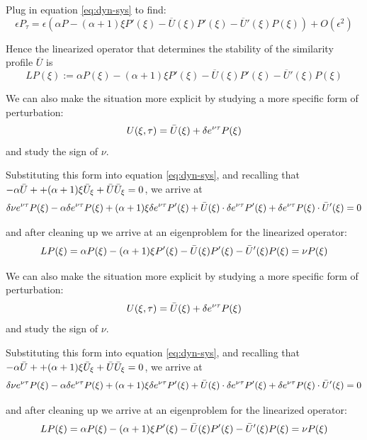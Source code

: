\documentclass[11pt,a4paper]{article}
\begin{document}
Plug in equation \ref{eq:dyn-sys} to find:
\begin{equation*}
    \epsilon P_\tau = \epsilon \left(\alpha P  -(\alpha + 1)\xi P'(\xi) - \overline{U}(\xi)P'(\xi) - \overline{U}'(\xi) P(\xi)\right) + O(\epsilon^2)
\end{equation*}

Hence the linearized operator that determines the stability of the similarity profile $\overline{U}$ is 
\begin{equation}\label{eq:linearized-op}
    LP(\xi):=\alpha P(\xi) -(\alpha + 1)\xi P'(\xi) - \overline{U}(\xi)P'(\xi) - \overline{U}'(\xi) P(\xi)
\end{equation}

We can also make the situation more explicit by studying a more specific form of perturbation:
$$U(\xi, \tau) = \Bar{U}(\xi) + \delta e^{\nu \tau}P(\xi)$$
and study the sign of $\nu$. 

Substituting this form into equation \ref{eq:dyn-sys}, and recalling that $-\alpha \Bar{U} + + (\alpha+1)\xi \Bar{U}_\xi + \Bar{U}\Bar{U}_\xi = 0$, we arrive at
$$\delta \nu e^{\nu \tau}P(\xi) - \alpha \delta e^{\nu \tau}P(\xi) + (\alpha+1) \xi \delta e^{\nu \tau}P'(\xi) + \Bar{U}(\xi)\cdot \delta e^{\nu \tau}P'(\xi) + \delta e^{\nu \tau}P(\xi)\cdot \Bar{U}'(\xi)=0$$

and after cleaning up we arrive at an eigenproblem for the linearized operator:
\begin{equation*}
    LP(\xi) =\alpha P(\xi) -(\alpha + 1)\xi P'(\xi) - \Bar{U}(\xi)P'(\xi) - \Bar{U}'(\xi) P(\xi) = \nu P(\xi)
\end{equation*}

We can also make the situation more explicit by studying a more specific form of perturbation:
$$U(\xi, \tau) = \Bar{U}(\xi) + \delta e^{\nu \tau}P(\xi)$$
and study the sign of $\nu$. 

Substituting this form into equation \ref{eq:dyn-sys}, and recalling that $-\alpha \Bar{U} + + (\alpha+1)\xi \Bar{U}_\xi + \Bar{U}\Bar{U}_\xi = 0$, we arrive at
$$\delta \nu e^{\nu \tau}P(\xi) - \alpha \delta e^{\nu \tau}P(\xi) + (\alpha+1) \xi \delta e^{\nu \tau}P'(\xi) + \Bar{U}(\xi)\cdot \delta e^{\nu \tau}P'(\xi) + \delta e^{\nu \tau}P(\xi)\cdot \Bar{U}'(\xi)=0$$

and after cleaning up we arrive at an eigenproblem for the linearized operator:
\begin{equation*}
    LP(\xi) =\alpha P(\xi) -(\alpha + 1)\xi P'(\xi) - \Bar{U}(\xi)P'(\xi) - \Bar{U}'(\xi) P(\xi) = \nu P(\xi)
\end{equation*}
\end{document}
